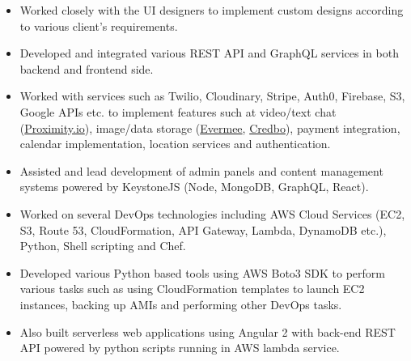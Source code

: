 \documentclass[10pt,a4paper,ragged2e]{maltacv}
\begin{document}
\begin{itemize}
  \item Worked closely with the UI designers to implement custom designs according to various client's requirements.
  \item Developed and integrated various REST API and GraphQL services in both backend and frontend side.
  \item Worked with services such as Twilio, Cloudinary, Stripe, Auth0, Firebase, S3, Google APIs etc. to implement features such at video/text chat (\href{https://prox.io/}{Proximity.io}), image/data storage (\href{https://play.google.com/store/apps/details?id=com.evermee}{Evermee}, \href{https://www.credbo.com/}{Credbo}), payment integration, calendar implementation, location services and authentication.  
  \item Assisted and lead development of admin panels and content management systems powered by KeystoneJS (Node, MongoDB, GraphQL, React).
\end{itemize}

\divider

\begin{itemize}
  \item Worked on several DevOps technologies including AWS Cloud Services (EC2, S3, Route 53, CloudFormation, API Gateway, Lambda, DynamoDB etc.), Python, Shell scripting and Chef. 
  \item Developed various Python based tools using AWS Boto3 SDK to perform various tasks such as using CloudFormation templates to launch EC2 instances, backing up AMIs and performing other DevOps tasks. 
  \item Also built serverless web applications using Angular 2 with back-end REST API powered by python scripts running in AWS lambda service.
\end{itemize}

\divider
\medskip

\end{document}

